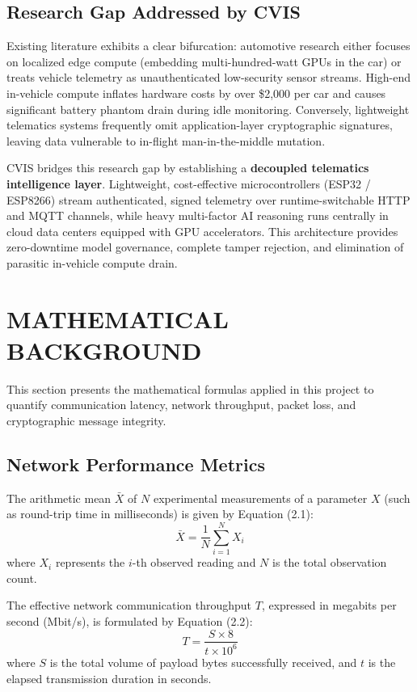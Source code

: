 \documentclass[12pt,a4paper]{report}
\begin{document}
\subsection{Research Gap Addressed by CVIS}
Existing literature exhibits a clear bifurcation: automotive research either focuses on localized edge compute (embedding multi-hundred-watt GPUs in the car) or treats vehicle telemetry as unauthenticated low-security sensor streams. High-end in-vehicle compute inflates hardware costs by over \$2,000 per car and causes significant battery phantom drain during idle monitoring. Conversely, lightweight telematics systems frequently omit application-layer cryptographic signatures, leaving data vulnerable to in-flight man-in-the-middle mutation.

CVIS bridges this research gap by establishing a \textbf{decoupled telematics intelligence layer}. Lightweight, cost-effective microcontrollers (ESP32 / ESP8266) stream authenticated, signed telemetry over runtime-switchable HTTP and MQTT channels, while heavy multi-factor AI reasoning runs centrally in cloud data centers equipped with GPU accelerators. This architecture provides zero-downtime model governance, complete tamper rejection, and elimination of parasitic in-vehicle compute drain.

\section{MATHEMATICAL BACKGROUND}
This section presents the mathematical formulas applied in this project to quantify communication latency, network throughput, packet loss, and cryptographic message integrity.

\subsection{Network Performance Metrics}
The arithmetic mean $\bar{X}$ of $N$ experimental measurements of a parameter $X$ (such as round-trip time in milliseconds) is given by Equation (2.1):
\begin{equation}
\bar{X} = \frac{1}{N}\sum_{i=1}^{N} X_i
\end{equation}
where $X_i$ represents the $i$-th observed reading and $N$ is the total observation count.

The effective network communication throughput $T$, expressed in megabits per second (Mbit/s), is formulated by Equation (2.2):
\begin{equation}
T = \frac{S \times 8}{t \times 10^6}
\end{equation}
where $S$ is the total volume of payload bytes successfully received, and $t$ is the elapsed transmission duration in seconds.
\end{document}
